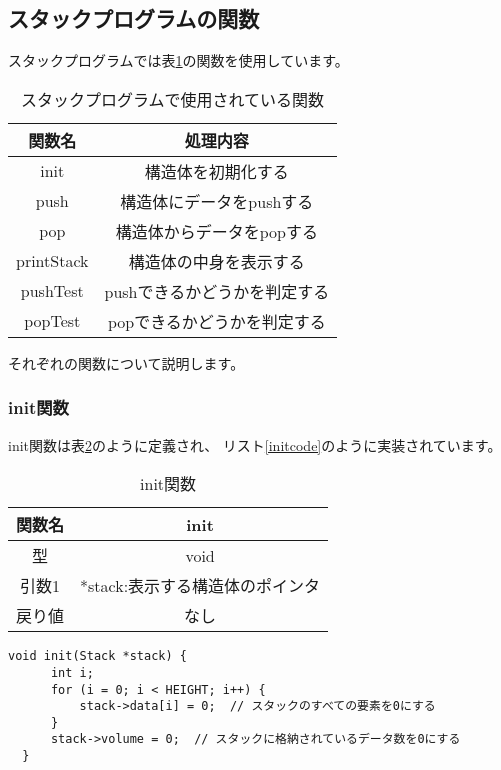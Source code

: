 \documentclass[a4j]{jarticle}
\begin{document}
\subsection{スタックプログラムの関数}
\label{sec:stack}
スタックプログラムでは表\ref{tb:stackfunction}の関数を使用しています。
\begin{table}[h]
  \centering
  \caption{スタックプログラムで使用されている関数}
  \label{tb:stackfunction}
  \begin{tabular}{|c|c|}
    \hline
    関数名        & 処理内容             \\
    \hline
    init       & 構造体を初期化する        \\
    \hline
    push       & 構造体にデータをpushする   \\
    \hline
    pop        & 構造体からデータをpopする   \\
    \hline
    printStack & 構造体の中身を表示する      \\
    \hline
    pushTest   & pushできるかどうかを判定する \\
    \hline
    popTest    & popできるかどうかを判定する  \\
    \hline
  \end{tabular}
\end{table}

それぞれの関数について説明します。

\subsubsection{init関数}
\label{sec:init}
init関数は表\ref{tb:init}のように定義され、
リスト\ref{initcode}のように実装されています。

\begin{table}[h]
  \centering
  \caption{init関数}
  \label{tb:init}
  \begin{tabular}{|c|c|}
    \hline
    関数名 & init                \\
    \hline
    型   & void                \\
    \hline
    引数1 & *stack:表示する構造体のポインタ \\
    \hline
    戻り値 & なし                  \\
    \hline
  \end{tabular}
\end{table}

\begin{lstlisting}[caption=init関数,label=initcode]
    void init(Stack *stack) {
      int i;
      for (i = 0; i < HEIGHT; i++) {
          stack->data[i] = 0;  // スタックのすべての要素を0にする
      }
      stack->volume = 0;  // スタックに格納されているデータ数を0にする
  }
  \end{lstlisting}
\end{document}
